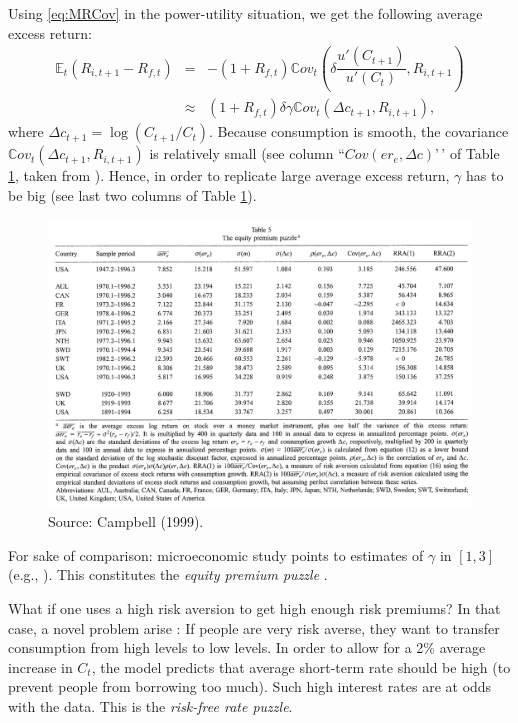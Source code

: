 \documentclass[
  12pt,
]{book}
\theoremstyle{definition}
\theoremstyle{definition}
\theoremstyle{definition}
\theoremstyle{definition}
\theoremstyle{remark}
\begin{document}
Using \eqref{eq:MRCov} in the power-utility situation, we get the following average excess return:
\begin{eqnarray*}
\mathbb{E}_t(R_{i,t+1} - R_{f,t}) &=& - (1 + R_{f,t}) \mathbb{C}ov_t\left(\delta \dfrac{u'(C_{t+1})}{u'(C_{t})},R_{i,t+1}\right)\\
&\approx& (1 + R_{f,t}) \delta \gamma  \mathbb{C}ov_t\left(\Delta c_{t+1},R_{i,t+1}\right),
\end{eqnarray*}
where \(\Delta c_{t+1} = \log(C_{t+1}/C_t)\).
Because consumption is smooth, the covariance \(\mathbb{C}ov_t\left(\Delta c_{t+1},R_{i,t+1}\right)\) is relatively small (see column ``\(Cov(er_e,\Delta c)\)'\,' of Table \ref{fig:Campbell1}, taken from \citet{Campbell_1999}).
Hence, in order to replicate large average excess return, \(\gamma\) has to be big (see last two columns of Table \ref{fig:Campbell1}).

\begin{figure}

{\centering \includegraphics[width=1\linewidth]{figures/table_campbell1999_eqpuzzle} 

}

\caption{Source: Campbell (1999).}\label{fig:Campbell1}
\end{figure}

For sake of comparison: microeconomic study points to estimates of \(\gamma\) in \([1,3]\) (e.g., \citet{Hartley_Lanot_Walker_2014}). This constitutes the \emph{equity premium puzzle} \citep{Mehra_Prescott_1985}.

What if one uses a high risk aversion to get high enough risk premiums? In that case, a novel problem arise \citep{Kandel_Stambaugh_1991}: If people are very risk averse, they want to transfer consumption from high levels to low levels.
In order to allow for a 2\% average increase in \(C_t\), the model predicts that average short-term rate should be high (to prevent people from borrowing too much). Such high interest rates are at odds with the data. This is the \emph{risk-free rate puzzle}.
\end{document}

